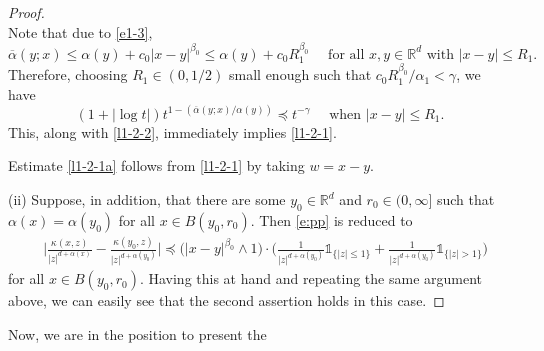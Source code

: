 \documentclass[a4paper,11pt]{amsart}
\renewcommand{\le}{\leqslant}
\newcommand{\R}{\mathds R}
\newcommand{\B}{\beta}
\newcommand{\I}{\mathds 1}
\newcommand{\p}{\preceq}
\newcommand{\K}{\kappa}
\newcommand{\A}{\alpha}
\newcommand{\G}{\gamma}
\theoremstyle{definition}
\begin{document}
\begin{proof}
\begin{equation}
\end{equation}
Note that due to \eqref{e1-3},
\begin{equation*}
\overline{\A}(y;x)\le \A(y)+c_0|x-y|^{\B_0}\le
\A(y)+c_0R_1^{\B_0}\quad\textrm{ for all } x,y\in\R^d\textrm{ with }|x-y|\le R_1.
 \end{equation*}
Therefore, choosing $R_1\in(0,{1}/{2})$ small enough such that
$c_0R_1^{\B_0} /\alpha_1 < \gamma$, we have
\begin{equation*}
(1+|\log t|)t^{1-({\overline{\A}(y;x)}/{\A(y)})}\p t^{-\G}\quad\textrm{ when }|x-y|\le R_1.
\end{equation*}
This, along with \eqref{l1-2-2}, immediately implies \eqref{l1-2-1}.


Estimate  \eqref{l1-2-1a} follows from \eqref{l1-2-1} by taking $w=x-y$.

\smallskip

(ii) Suppose, in addition, that  there are some $y_0\in\R^d$ and $r_0\in(0,\infty]$ such that
 $\alpha(x)=\alpha(y_0)$ for all $x \in B(y_0,r_0)$. Then \eqref{e:pp} is reduced to
\begin{equation*}
\begin{split}
&\bigg|\frac{\K(x,z)}{|z|^{d+\A(x)}}-\frac{\K(y_0,z)}{|z|^{d+\A(y_0)}}\bigg|\p \big(|x-y|^{\beta_0}\wedge
1\big)\cdot\bigg(\frac{1}{|z|^{d+\A(y_0)}}\I_{\{|z|\le 1\}}+ \frac{1}{|z|^{d+
\A(y_0)}}\I_{\{|z|> 1\}}\bigg)
\end{split}
\end{equation*} for all $x\in B(y_0,r_0)$.
Having this at hand and repeating the same argument above, we can
easily see that the second assertion holds in this case.
\end{proof}

Now, we are in the position to present the
\end{document}
